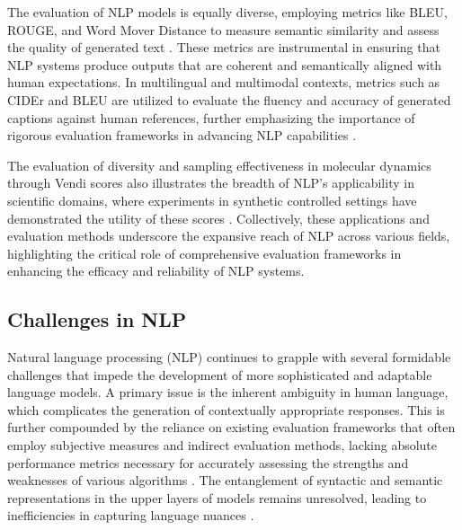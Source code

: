 The evaluation of NLP models is equally diverse, employing metrics like BLEU, ROUGE, and Word Mover Distance to measure semantic similarity and assess the quality of generated text \cite{yamshchikov2020styletransferparaphraselookingsensible}. These metrics are instrumental in ensuring that NLP systems produce outputs that are coherent and semantically aligned with human expectations. In multilingual and multimodal contexts, metrics such as CIDEr and BLEU are utilized to evaluate the fluency and accuracy of generated captions against human references, further emphasizing the importance of rigorous evaluation frameworks in advancing NLP capabilities \cite{thapliyal2022crossmodal3600massivelymultilingualmultimodal}.



The evaluation of diversity and sampling effectiveness in molecular dynamics through Vendi scores also illustrates the breadth of NLP's applicability in scientific domains, where experiments in synthetic controlled settings have demonstrated the utility of these scores \cite{pasarkar2024cousinsvendiscorefamily}. Collectively, these applications and evaluation methods underscore the expansive reach of NLP across various fields, highlighting the critical role of comprehensive evaluation frameworks in enhancing the efficacy and reliability of NLP systems.



\subsection{Challenges in NLP} \label{subsec:Challenges in NLP}

Natural language processing (NLP) continues to grapple with several formidable challenges that impede the development of more sophisticated and adaptable language models. A primary issue is the inherent ambiguity in human language, which complicates the generation of contextually appropriate responses. This is further compounded by the reliance on existing evaluation frameworks that often employ subjective measures and indirect evaluation methods, lacking absolute performance metrics necessary for accurately assessing the strengths and weaknesses of various algorithms \cite{shi2019newevaluationframeworktopic}. The entanglement of syntactic and semantic representations in the upper layers of models remains unresolved, leading to inefficiencies in capturing language nuances \cite{zheng2023layerwiserepresentationfusioncompositional}.



